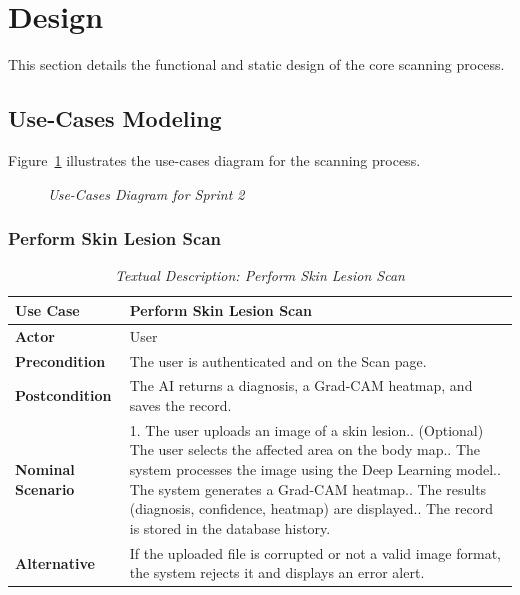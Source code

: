 \section{Design}
This section details the functional and static design of the core scanning process.

\subsection{Use-Cases Modeling}
Figure~\ref{fig:sprint2_usecase} illustrates the use-cases diagram for the scanning process.

\begin{figure}[H]
	\centering
	\caption{\textit{Use-Cases Diagram for Sprint 2}}
	\label{fig:sprint2_usecase}
\end{figure}

\subsubsection{Perform Skin Lesion Scan}
\begin{table}[H]
	\centering
	\footnotesize
	\renewcommand{\arraystretch}{1.5}
	\begin{tabular}{|p{3cm}|p{11.5cm}|}
		\hline
		\rowcolor[HTML]{1F3864}
		{\color{white}\textbf{Use Case}} & {\color{white}\textbf{Perform Skin Lesion Scan}} \\
		\hline
		\textbf{Actor} & User \\
		\hline
		\textbf{Precondition} & The user is authenticated and on the Scan page. \\
		\hline
		\textbf{Postcondition} & The AI returns a diagnosis, a Grad-CAM heatmap, and saves the record. \\
		\hline
		\textbf{Nominal Scenario} & 
		1. The user uploads an image of a skin lesion.\newline
		2. (Optional) The user selects the affected area on the body map.\newline
		3. The system processes the image using the Deep Learning model.\newline
		4. The system generates a Grad-CAM heatmap.\newline
		5. The results (diagnosis, confidence, heatmap) are displayed.\newline
		6. The record is stored in the database history. \\
		\hline
		\textbf{Alternative} & 
		If the uploaded file is corrupted or not a valid image format, the system rejects it and displays an error alert. \\
		\hline
	\end{tabular}
	\caption{\textit{Textual Description: Perform Skin Lesion Scan}}
\end{table}

